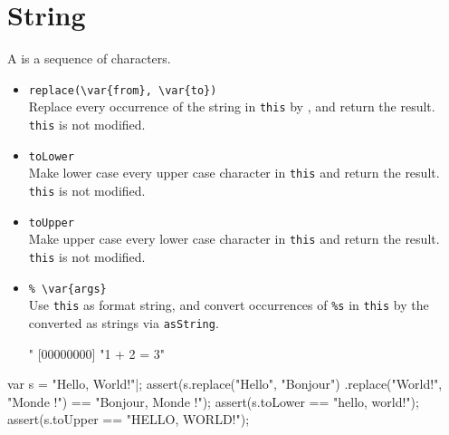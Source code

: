 \section{String}

A  is a sequence of characters.

\begin{itemize}
\item \lstinline|replace(\var{from}, \var{to})|\\
  Replace every occurrence of the string  in
  \lstinline|this| by , and return the result.
  \lstinline|this| is not modified.
\item \lstinline|toLower|\\
  Make lower case every upper case character in \lstinline|this| and
  return the result.  \lstinline|this| is not modified.
\item \lstinline|toUpper|\\
  Make upper case every lower case character in \lstinline|this| and
  return the result.  \lstinline|this| is not modified.
\item \lstinline|% \var{args}|\\
  Use \lstinline|this| as format string, and convert occurrences of
  \lstinline|%s| in \lstinline|this| by the  converted as
  strings via \lstinline|asString|.
\begin{urbiscript}
"%
[00000000] "1 + 2 = 3"
\end{urbiscript}
\end{itemize}

\begin{urbiscript}
var s = "Hello, World!\n"|;
assert(s.replace("Hello", "Bonjour")
        .replace("World!", "Monde !")
       == "Bonjour, Monde !\n");
assert(s.toLower == "hello, world!\n");
assert(s.toUpper == "HELLO, WORLD!\n");
\end{urbiscript}

